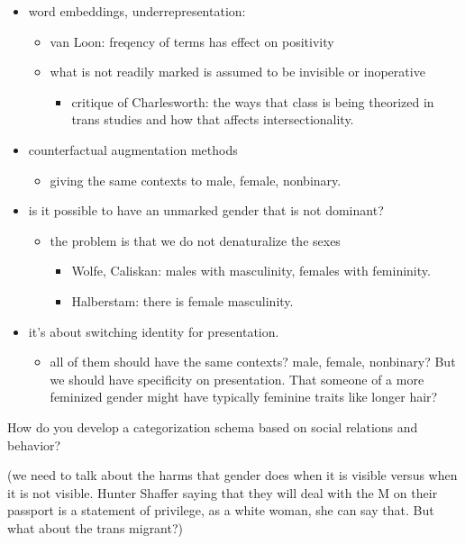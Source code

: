 \documentclass[11pt]{article}
\begin{document}
\begin{itemize}
\begin{itemize}
\begin{itemize}
\end{itemize}
\end{itemize}
\item word embeddings, underrepresentation:
\begin{itemize}
\item van Loon: freqency of terms has effect on positivity
\item what is not readily marked is assumed to be invisible or inoperative
\begin{itemize}
\item critique of Charlesworth: the ways that class is being theorized
in trans studies and how that affects intersectionality.
\end{itemize}
\end{itemize}
\item counterfactual augmentation methods
\begin{itemize}
\item giving the same contexts to male, female, nonbinary.
\end{itemize}
\item is it possible to have an unmarked gender that is not dominant?
\begin{itemize}
\item the problem is that we do not denaturalize the sexes
\begin{itemize}
\item Wolfe, Caliskan: males with masculinity, females with
femininity.
\item Halberstam: there is female masculinity.
\end{itemize}
\end{itemize}
\item it's about switching identity for presentation. 
\begin{itemize}
\item all of them should have the same contexts? male, female,
nonbinary? But we should have specificity on presentation. That
someone of a more feminized gender might have typically feminine
traits like longer hair?
\end{itemize}
\end{itemize}

How do you develop a categorization schema based on social relations
and behavior?

(we need to talk about the harms that gender does when it is visible
versus when it is not visible. Hunter Shaffer saying that they will
deal with the M on their passport is a statement of privilege, as a
white woman, she can say that. But what about the trans migrant?) 
\end{document}
